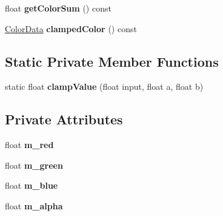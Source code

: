 \begin{DoxyCompactItemize}
\item 
\hypertarget{classColorData_a3f0f9e50c730eb653efd800070cf448c}{float {\bfseries get\-Color\-Sum} () const }\label{classColorData_a3f0f9e50c730eb653efd800070cf448c}

\item 
\hypertarget{classColorData_a5479f50514f714dc9c738a50b7b86365}{\hyperlink{classColorData}{Color\-Data} {\bfseries clamped\-Color} () const }\label{classColorData_a5479f50514f714dc9c738a50b7b86365}

\end{DoxyCompactItemize}
\subsection*{Static Private Member Functions}
\begin{DoxyCompactItemize}
\item 
\hypertarget{classColorData_a2e6ef72b4053a043ac66f3c53556b89c}{static float {\bfseries clamp\-Value} (float input, float a, float b)}\label{classColorData_a2e6ef72b4053a043ac66f3c53556b89c}

\end{DoxyCompactItemize}
\subsection*{Private Attributes}
\begin{DoxyCompactItemize}
\item 
\hypertarget{classColorData_ab085dd5021fee2698e03baf20d89bfc4}{float {\bfseries m\-\_\-red}}\label{classColorData_ab085dd5021fee2698e03baf20d89bfc4}

\item 
\hypertarget{classColorData_a594f89816d552a2cfcb91fe0ce8df2ce}{float {\bfseries m\-\_\-green}}\label{classColorData_a594f89816d552a2cfcb91fe0ce8df2ce}

\item 
\hypertarget{classColorData_a811102de4cfed5429beedcc67714520f}{float {\bfseries m\-\_\-blue}}\label{classColorData_a811102de4cfed5429beedcc67714520f}

\item 
\hypertarget{classColorData_ae8318f47f7ba2a9e2fd70b7dd03ef672}{float {\bfseries m\-\_\-alpha}}\label{classColorData_ae8318f47f7ba2a9e2fd70b7dd03ef672}

\end{DoxyCompactItemize}
